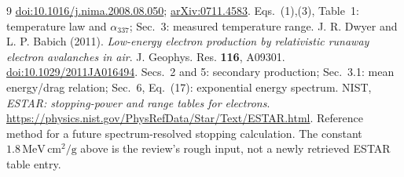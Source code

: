 \documentclass[11pt,a4paper]{article}
\begin{document}
\begin{thebibliography}{9}
\href{https://doi.org/10.1016/j.nima.2008.08.050}{doi:10.1016/j.nima.2008.08.050};
\href{https://arxiv.org/abs/0711.4583}{arXiv:0711.4583}.
Eqs.~(1),(3), Table~1: temperature law and $\alpha_{337}$; Sec.~3: measured temperature range.
J. R. Dwyer and L. P. Babich (2011).
\emph{Low-energy electron production by relativistic runaway electron avalanches in air}.
J. Geophys. Res. \textbf{116}, A09301.
\href{https://doi.org/10.1029/2011JA016494}{doi:10.1029/2011JA016494}.
Secs.~2 and 5: secondary production; Sec.~3.1: mean energy/drag relation; Sec.~6, Eq.~(17): exponential energy spectrum.
NIST, \emph{ESTAR: stopping-power and range tables for electrons}.
\url{https://physics.nist.gov/PhysRefData/Star/Text/ESTAR.html}.
Reference method for a future spectrum-resolved stopping calculation. The constant $1.8\,\mathrm{MeV\,cm^2/g}$ above is the review's rough input, not a newly retrieved ESTAR table entry.
\end{thebibliography}
\endgroup
\end{document}
